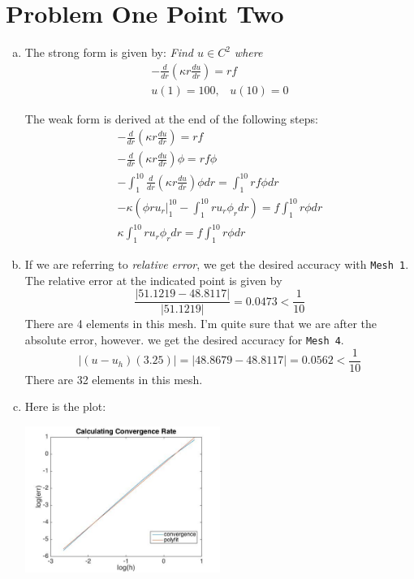 \documentclass[12pt]{article}
\newcommand{\rint}[1]{\int_1^{10} #1 dr}
\begin{document}
\section*{Problem One Point Two}
\begin{enumerate}[(a)]
\item 
The strong form is given by:
\emph{Find $u\in C^2$ where}
\begin{gather*}
-\frac{d}{dr}(\kappa r\frac{du}{dr}) = rf\\
u(1) = 100,\;\;\; u(10) = 0
\end{gather*}

The weak form is derived at the end of the following steps:
\begin{gather*}
-\frac{d}{dr}(\kappa r\frac{du}{dr}) = rf\\
-\frac{d}{dr}(\kappa r\frac{du}{dr})\phi = rf\phi\\
-\rint{\frac{d}{dr}(\kappa r\frac{du}{dr})\phi} = \rint{rf\phi}\\
-\kappa\left(\phi r u_r\Big|_1^{10} - \rint{ru_r\phi_r}\right) = f\rint{r\phi}\\
\kappa\rint{ru_r\phi_r} = f\rint{r\phi}
\end{gather*}

\item If we are referring to \emph{relative error}, we get the desired accuracy with \texttt{Mesh 1}. The relative error at the indicated point is given by 
\begin{equation*}
\frac{|51.1219 - 48.8117|}{|51.1219|} = 0.0473 < \frac1{10}
\end{equation*}
There are 4 elements in this mesh. I'm quite sure that we are after the absolute error, however. we get the desired accuracy for \texttt{Mesh 4}.
\begin{equation*}
|(u - u_h)(3.25)| = |48.8679 - 48.8117| = 0.0562 < \frac1{10}
\end{equation*}
There are 32 elements in this mesh.
\item Here is the plot:

\includegraphics[width=0.5\textwidth]{prob12b.jpg}


\end{enumerate}
\end{document}
